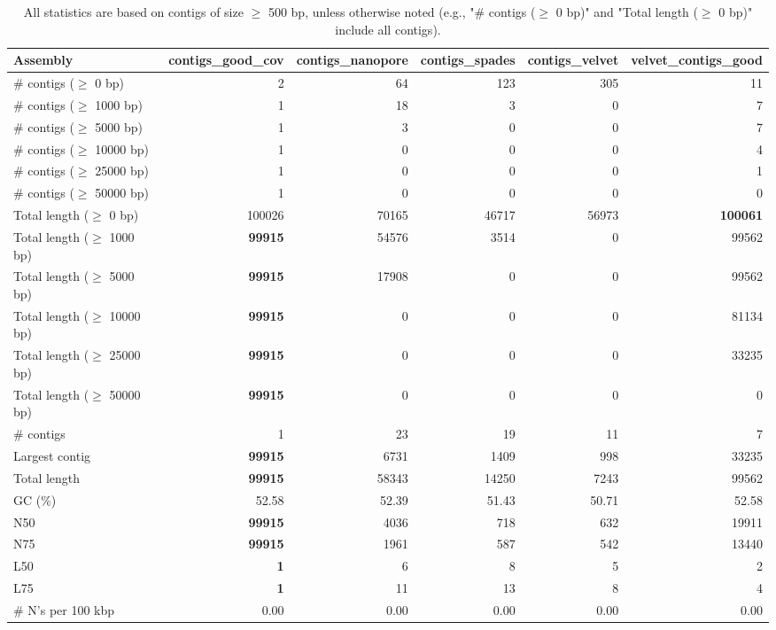 \documentclass[12pt,a4paper]{article}
\begin{document}
\begin{table}[ht]
\begin{center}
\caption{All statistics are based on contigs of size $\geq$ 500 bp, unless otherwise noted (e.g., "\# contigs ($\geq$ 0 bp)" and "Total length ($\geq$ 0 bp)" include all contigs).}
\begin{tabular}{|l*{5}{|r}|}
\hline
Assembly & contigs\_good\_cov & contigs\_nanopore & contigs\_spades & contigs\_velvet & velvet\_contigs\_good \\ \hline
\# contigs ($\geq$ 0 bp) & 2 & 64 & 123 & 305 & 11 \\ \hline
\# contigs ($\geq$ 1000 bp) & 1 & 18 & 3 & 0 & 7 \\ \hline
\# contigs ($\geq$ 5000 bp) & 1 & 3 & 0 & 0 & 7 \\ \hline
\# contigs ($\geq$ 10000 bp) & 1 & 0 & 0 & 0 & 4 \\ \hline
\# contigs ($\geq$ 25000 bp) & 1 & 0 & 0 & 0 & 1 \\ \hline
\# contigs ($\geq$ 50000 bp) & 1 & 0 & 0 & 0 & 0 \\ \hline
Total length ($\geq$ 0 bp) & 100026 & 70165 & 46717 & 56973 & {\bf 100061} \\ \hline
Total length ($\geq$ 1000 bp) & {\bf 99915} & 54576 & 3514 & 0 & 99562 \\ \hline
Total length ($\geq$ 5000 bp) & {\bf 99915} & 17908 & 0 & 0 & 99562 \\ \hline
Total length ($\geq$ 10000 bp) & {\bf 99915} & 0 & 0 & 0 & 81134 \\ \hline
Total length ($\geq$ 25000 bp) & {\bf 99915} & 0 & 0 & 0 & 33235 \\ \hline
Total length ($\geq$ 50000 bp) & {\bf 99915} & 0 & 0 & 0 & 0 \\ \hline
\# contigs & 1 & 23 & 19 & 11 & 7 \\ \hline
Largest contig & {\bf 99915} & 6731 & 1409 & 998 & 33235 \\ \hline
Total length & {\bf 99915} & 58343 & 14250 & 7243 & 99562 \\ \hline
GC (\%) & 52.58 & 52.39 & 51.43 & 50.71 & 52.58 \\ \hline
N50 & {\bf 99915} & 4036 & 718 & 632 & 19911 \\ \hline
N75 & {\bf 99915} & 1961 & 587 & 542 & 13440 \\ \hline
L50 & {\bf 1} & 6 & 8 & 5 & 2 \\ \hline
L75 & {\bf 1} & 11 & 13 & 8 & 4 \\ \hline
\# N's per 100 kbp & 0.00 & 0.00 & 0.00 & 0.00 & 0.00 \\ \hline
\end{tabular}
\end{center}
\end{table}
\end{document}
